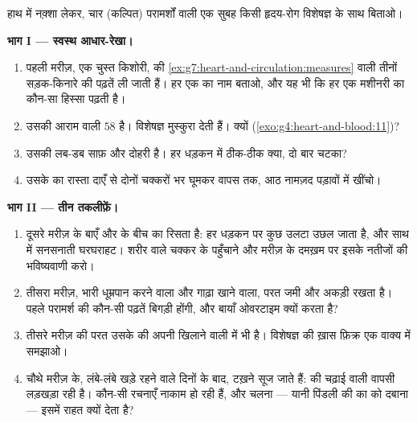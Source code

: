 \begin{problem}[{सप्ताहांत समस्या --- चार परामर्श, और जाल का एक
नक़्शा}]\label{pb:g7:heart-and-circulation:1}
हाथ में नक़्शा लेकर, चार (कल्पित) परामर्शों वाली एक सुबह किसी
हृदय-रोग विशेषज्ञ के साथ बिताओ।

\medskip\noindent\textbf{भाग I --- स्वस्थ आधार-रेखा।}
\begin{enumerate}
  \item पहली मरीज़, एक चुस्त किशोरी, की
        \cref{ex:g7:heart-and-circulation:measures} वाली तीनों
        सड़क-किनारे की पढ़तें ली जाती हैं। हर एक का नाम बताओ, और यह
        भी कि हर एक मशीनरी का कौन-सा हिस्सा पढ़ती है।
  \item उसकी आराम वाली  $58$ है। विशेषज्ञ मुस्कुरा देती हैं।
        क्यों (\cref{exo:g4:heart-and-blood:11})?
  \item उसकी लब-डब साफ़ और दोहरी है। हर धड़कन में ठीक-ठीक क्या,
        दो बार चटका?
  \item उसके  का रास्ता दाएँ  से दोनों चक्करों भर घूमकर
        वापस तक, आठ नामज़द पड़ावों में खींचो।
\end{enumerate}

\medskip\noindent\textbf{भाग II --- तीन तकलीफ़ें।}
\begin{enumerate}[resume]
  \item दूसरे मरीज़ के बाएँ  और  के बीच का  रिसता है:
        हर धड़कन पर कुछ  उलटा उछल जाता है, और साथ में सनसनाती
        घरघराहट। शरीर वाले चक्कर के पहुँचाने और मरीज़ के दमख़म पर
        इसके नतीजों की भविष्यवाणी करो।
  \item तीसरा मरीज़, भारी धूम्रपान करने वाला और गाढ़ा खाने वाला,
        परत जमी और अकड़ी  रखता है। पहले परामर्श की कौन-सी
        पढ़तें बिगड़ी होंगी, और बायाँ  ओवरटाइम क्यों करता है?
  \item तीसरे मरीज़ की परत उसके  की अपनी खिलाने वाली  में
        भी है। विशेषज्ञ की ख़ास फ़िक्र एक वाक्य में समझाओ।
  \item चौथे मरीज़ के, लंबे-लंबे खड़े रहने वाले दिनों के बाद, टख़ने
        सूज जाते हैं:  की चढ़ाई वाली वापसी लड़खड़ा रही है।
        कौन-सी रचनाएँ नाकाम हो रही हैं, और चलना --- यानी पिंडली की
         का  को दबाना --- इसमें राहत क्यों देता है?
\end{enumerate}


\end{problem}
